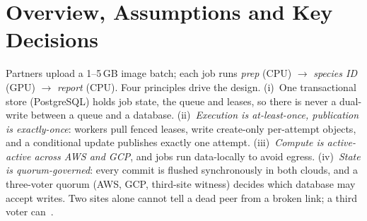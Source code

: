 \documentclass[10pt,a4paper]{article}
\begin{document}
\setcounter{page}{1}

\section{Overview, Assumptions and Key Decisions}
Partners upload a 1--5\,GB image batch; each job runs \emph{prep} (CPU) $\rightarrow$
\emph{species ID} (GPU) $\rightarrow$ \emph{report} (CPU). Four principles drive the design.
(i)~One transactional store (PostgreSQL) holds job state, the queue and leases, so there is never a
dual-write between a queue and a database.
(ii)~\emph{Execution is at-least-once, publication is exactly-once}: workers pull fenced leases, write
create-only per-attempt objects, and a conditional update publishes exactly one attempt.
(iii)~\emph{Compute is active-active across AWS and GCP}, and jobs run data-locally to avoid egress.
(iv)~\emph{State is quorum-governed}: every commit is flushed synchronously in both clouds, and a
three-voter quorum (AWS, GCP, third-site witness) decides which database may accept writes. Two sites
alone cannot tell a dead peer from a broken link; a third voter can~\cite{gilbert-lynch,etcd-faq}.
\end{document}
